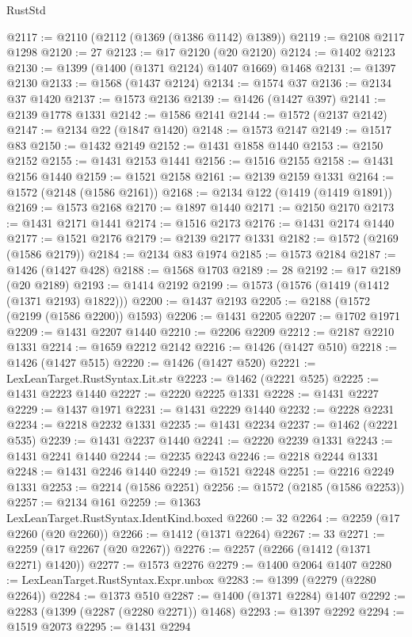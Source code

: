\begin{lexlean}{RustStd}
\begin{coremodule}
@2117 := @2110 (@2112 (@1369 (@1386 @1142) @1389))
@2119 := @2108 @2117 @1298
@2120 := 27
@2123 := @17 @2120 (@20 @2120)
@2124 := @1402 @2123
@2130 := @1399 (@1400 (@1371 @2124) @1407 @1669) @1468
@2131 := @1397 @2130
@2133 := @1568 (@1437 @2124)
@2134 := @1574 @37
@2136 := @2134 @37 @1420
@2137 := @1573 @2136
@2139 := @1426 (@1427 @397)
@2141 := @2139 @1778 @1331
@2142 := @1586 @2141
@2144 := @1572 (@2137 @2142)
@2147 := @2134 @22 (@1847 @1420)
@2148 := @1573 @2147
@2149 := @1517 @83
@2150 := @1432 @2149
@2152 := @1431 @1858 @1440
@2153 := @2150 @2152
@2155 := @1431 @2153 @1441
@2156 := @1516 @2155
@2158 := @1431 @2156 @1440
@2159 := @1521 @2158
@2161 := @2139 @2159 @1331
@2164 := @1572 (@2148 (@1586 @2161))
@2168 := @2134 @122 (@1419 (@1419 @1891))
@2169 := @1573 @2168
@2170 := @1897 @1440
@2171 := @2150 @2170
@2173 := @1431 @2171 @1441
@2174 := @1516 @2173
@2176 := @1431 @2174 @1440
@2177 := @1521 @2176
@2179 := @2139 @2177 @1331
@2182 := @1572 (@2169 (@1586 @2179))
@2184 := @2134 @83 @1974
@2185 := @1573 @2184
@2187 := @1426 (@1427 @428)
@2188 := @1568 @1703
@2189 := 28
@2192 := @17 @2189 (@20 @2189)
@2193 := @1414 @2192
@2199 := @1573 (@1576 (@1419 (@1412 (@1371 @2193) @1822)))
@2200 := @1437 @2193
@2205 := @2188 (@1572 (@2199 (@1586 @2200)) @1593)
@2206 := @1431 @2205
@2207 := @1702 @1971
@2209 := @1431 @2207 @1440
@2210 := @2206 @2209
@2212 := @2187 @2210 @1331
@2214 := @1659 @2212 @2142
@2216 := @1426 (@1427 @510)
@2218 := @1426 (@1427 @515)
@2220 := @1426 (@1427 @520)
@2221 := LexLeanTarget.RustSyntax.Lit.str
@2223 := @1462 (@2221 @525)
@2225 := @1431 @2223 @1440
@2227 := @2220 @2225 @1331
@2228 := @1431 @2227
@2229 := @1437 @1971
@2231 := @1431 @2229 @1440
@2232 := @2228 @2231
@2234 := @2218 @2232 @1331
@2235 := @1431 @2234
@2237 := @1462 (@2221 @535)
@2239 := @1431 @2237 @1440
@2241 := @2220 @2239 @1331
@2243 := @1431 @2241 @1440
@2244 := @2235 @2243
@2246 := @2218 @2244 @1331
@2248 := @1431 @2246 @1440
@2249 := @1521 @2248
@2251 := @2216 @2249 @1331
@2253 := @2214 (@1586 @2251)
@2256 := @1572 (@2185 (@1586 @2253))
@2257 := @2134 @161
@2259 := @1363 LexLeanTarget.RustSyntax.IdentKind.boxed
@2260 := 32
@2264 := @2259 (@17 @2260 (@20 @2260))
@2266 := @1412 (@1371 @2264)
@2267 := 33
@2271 := @2259 (@17 @2267 (@20 @2267))
@2276 := @2257 (@2266 (@1412 (@1371 @2271) @1420))
@2277 := @1573 @2276
@2279 := @1400 @2064 @1407
@2280 := LexLeanTarget.RustSyntax.Expr.unbox
@2283 := @1399 (@2279 (@2280 @2264))
@2284 := @1373 @510
@2287 := @1400 (@1371 @2284) @1407
@2292 := @2283 (@1399 (@2287 (@2280 @2271)) @1468)
@2293 := @1397 @2292
@2294 := @1519 @2073
@2295 := @1431 @2294

\end{coremodule}
\end{lexlean}
